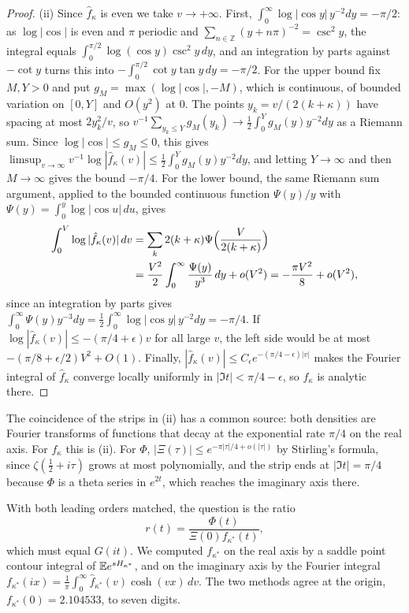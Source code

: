 \begin{proof}
(ii) Since $\hat f_\kappa$ is even we take $v\to+\infty$. First, $\int_0^\infty\log|\cos y|\,y^{-2}dy=-\pi/2$: as $\log|\cos|$ is even and $\pi$ periodic and $\sum_{n\in\mathbb Z}(y+n\pi)^{-2}=\csc^2y$, the integral equals $\int_0^{\pi/2}\log(\cos y)\csc^2y\,dy$, and an integration by parts against $-\cot y$ turns this into $-\int_0^{\pi/2}\cot y\tan y\,dy=-\pi/2$. For the upper bound fix $M,Y>0$ and put $g_M=\max(\log|\cos|,-M)$, which is continuous, of bounded variation on $[0,Y]$ and $O(y^2)$ at $0$. The points $y_k=v/(2(k+\kappa))$ have spacing at most $2y_k^2/v$, so $v^{-1}\sum_{y_k\le Y}g_M(y_k)\to\frac12\int_0^Yg_M(y)y^{-2}dy$ as a Riemann sum. Since $\log|\cos|\le g_M\le0$, this gives $\limsup_{v\to\infty}v^{-1}\log|\hat f_\kappa(v)|\le\frac12\int_0^Yg_M(y)y^{-2}dy$, and letting $Y\to\infty$ and then $M\to\infty$ gives the bound $-\pi/4$. For the lower bound, the same Riemann sum argument, applied to the bounded continuous function $\Psi(y)/y$ with $\Psi(y)=\int_0^y\log|\cos u|\,du$, gives
\begin{align*}
\int_0^V\log|\hat f_\kappa(v)|\,dv&=\sum_k2(k+\kappa)\Psi\Bigl(\frac V{2(k+\kappa)}\Bigr)\\
&=\frac{V^2}2\int_0^\infty\frac{\Psi(y)}{y^3}\,dy+o(V^2)=-\frac{\pi V^2}8+o(V^2),
\end{align*}
since an integration by parts gives $\int_0^\infty\Psi(y)y^{-3}dy=\frac12\int_0^\infty\log|\cos y|\,y^{-2}dy=-\pi/4$. If $\log|\hat f_\kappa(v)|\le-(\pi/4+\epsilon)v$ for all large $v$, the left side would be at most $-(\pi/8+\epsilon/2)V^2+O(1)$. Finally, $|\hat f_\kappa(v)|\le C_\epsilon e^{-(\pi/4-\epsilon)|v|}$ makes the Fourier integral of $\hat f_\kappa$ converge locally uniformly in $|\Im t|<\pi/4-\epsilon$, so $f_\kappa$ is analytic there.
\end{proof}

The coincidence of the strips in (ii) has a common source: both densities are Fourier transforms of functions that decay at the exponential rate $\pi/4$ on the real axis. For $f_\kappa$ this is (ii). For $\Phi$, $|\Xi(\tau)|\le e^{-\pi|\tau|/4+o(|\tau|)}$ by Stirling's formula, since $\zeta(\frac12+i\tau)$ grows at most polynomially, and the strip ends at $|\Im t|=\pi/4$ because $\Phi$ is a theta series in $e^{2t}$, which reaches the imaginary axis there.

With both leading orders matched, the question is the ratio
\[
r(t)=\frac{\Phi(t)}{\Xi(0)f_{\kappa^*}(t)},
\]
which must equal $G(it)$. We computed $f_{\kappa^*}$ on the real axis by a saddle point contour integral of $\mathbb{E} e^{s H_{\kappa^*}}$, and on the imaginary axis by the Fourier integral $f_{\kappa^*}(ix)=\frac1\pi\int_0^\infty\hat f_{\kappa^*}(v)\cosh(vx)\,dv$. The two methods agree at the origin, $f_{\kappa^*}(0)=2.104533$, to seven digits.

